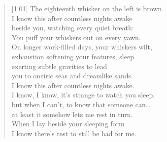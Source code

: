 \begin{verse}[1.01\textwidth]
The eighteenth whisker on the left is brown.\\
\vin I know this after countless nights awake\\
beside you, watching every quiet breath:\\
\vin You puff your whiskers out on every yawn.\\
On longer work-filled days, your whiskers wilt,\\
\vin exhaustion softening your features, sleep\\
exerting subtle gravities to lead\\
\vin you to oneiric seas and dreamlike sands.\\
I know this after countless nights awake.\\
\vin I know, I know, it's strange to watch you sleep,\\
but when I can't, to know that someone can\ldots{}\\
\vin at least it somehow lets me rest in turn.\\
When I lay beside your sleeping form\\
\vin I know there's rest to still be had for me.
\end{verse}
